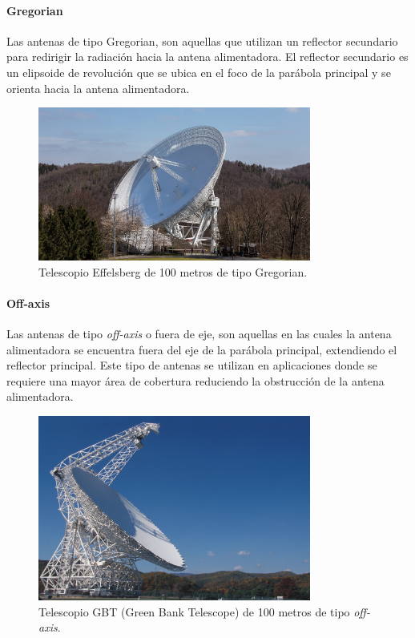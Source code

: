 \paragraph{Gregorian}

Las antenas de tipo Gregorian, son aquellas que utilizan un reflector secundario para redirigir la radiación hacia la antena alimentadora. El reflector secundario es un elipsoide de revolución que se ubica en el foco de la parábola principal y se orienta hacia la antena alimentadora.

\begin{figure}
    \centering
    \includegraphics[width = 0.8\textwidth]{img/gregorian.jpg}
    \caption{Telescopio Effelsberg de 100 metros de tipo Gregorian.}
    \label{fig:greg}
\end{figure}

\paragraph{Off-axis}

Las antenas de tipo \textit{off-axis} o fuera de eje, son aquellas en las cuales la antena alimentadora se encuentra fuera del eje de la parábola principal, extendiendo el reflector principal. Este tipo de antenas se utilizan en aplicaciones donde se requiere una mayor área de cobertura reduciendo la obstrucción de la antena alimentadora.

\begin{figure}
    \centering
    \includegraphics[width = 0.8\textwidth]{img/off-axis.jpg}
    \caption{Telescopio GBT (Green Bank Telescope) de 100 metros de tipo \textit{off-axis}.}
    \label{fig:off}
\end{figure}


